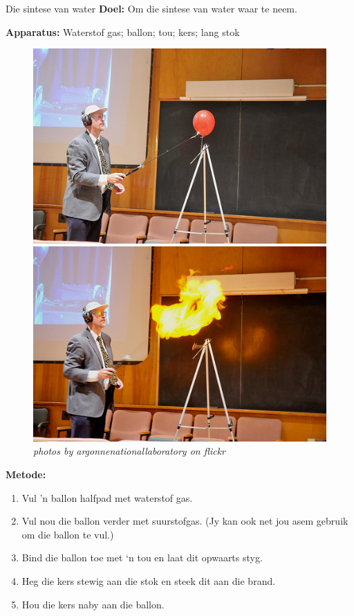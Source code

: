             \begin{g_experiment}{Die sintese van water}
            \nopagebreak
            \label{m38709*id63175}\noindent{}\textbf{Doel:}\newline
    Om die sintese van water waar te neem. \par 
        \label{m38709*id63194}\noindent{}\textbf{Apparatus:}\newline
    Waterstof gas; ballon; tou; kers; lang stok\par 
      \label{m38709*id63199}
    \setcounter{subfigure}{0}
	\begin{figure}[H] %
    \begin{center}
\includegraphics[width=.3\textwidth]{photos/hydrogen_balloon1.jpg} 
\includegraphics[width=.3\textwidth]{photos/hydrogen_balloon2_argonnenationallaboratory.jpg} \\
\textsl{photos by argonnenationallaboratory on flickr}
    \end{center}
 \end{figure}  
        \label{m38709*id63206}\noindent{}\textbf{Metode:}\label{m38709*id63212}\begin{enumerate}[noitemsep, label=\textbf{\arabic*}. ] 
\item Vul 'n ballon halfpad met waterstof gas.
\item Vul nou die ballon verder met suurstofgas. (Jy kan ook net jou asem gebruik om die ballon te vul.)
\item Bind die ballon toe met ‘n tou en laat dit opwaarts styg.
\item Heg die kers stewig aan die stok en steek dit aan die brand.
\item Hou die kers naby aan die ballon.
\end{enumerate}

\end{g_experiment}
